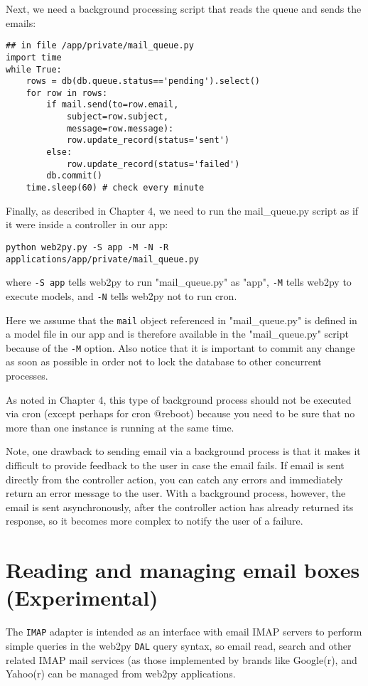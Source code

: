 \documentclass[justified,sixbynine,notoc]{tufte-book}
\def\ft{\small\tt}
\begin{document}
\begin{fullwidth}
Next, we need a background processing script that reads the queue and sends the emails:
\begin{lstlisting}
## in file /app/private/mail_queue.py
import time
while True:
    rows = db(db.queue.status=='pending').select()
    for row in rows:
        if mail.send(to=row.email,
            subject=row.subject,
            message=row.message):
            row.update_record(status='sent')
        else:
            row.update_record(status='failed')
        db.commit()
    time.sleep(60) # check every minute
\end{lstlisting}

Finally, as described in Chapter 4, we need to run the mail\_queue.py script as if it were inside a controller in our app:
\begin{lstlisting}
python web2py.py -S app -M -N -R applications/app/private/mail_queue.py
\end{lstlisting}
\noindent where {\ft -S app} tells web2py to run "mail\_queue.py" as "app", {\ft -M} tells web2py to execute models, and {\ft -N} tells web2py not to run cron.

Here we assume that the {\ft mail} object referenced in "mail\_queue.py" is defined in a model file in our app and is therefore available in the "mail\_queue.py" script because of the {\ft -M} option. Also notice that it is important to commit any change as soon as possible in order not to lock the database to other concurrent processes.

As noted in Chapter 4, this type of background process should not be executed via cron (except perhaps for cron @reboot) because you need to be sure that no more than one instance is running at the same time.

Note, one drawback to sending email via a background process is that it makes it difficult to provide feedback to the user in case the email fails. If email is sent directly from the controller action, you can catch any errors and immediately return an error message to the user. With a background process, however, the email is sent asynchronously, after the controller action has already returned its response, so it becomes more complex to notify the user of a failure.

\goodbreak\section{Reading and managing email boxes (Experimental)}

The {\ft IMAP} adapter is intended as an interface with email IMAP servers to perform simple queries in the web2py {\ft DAL} query syntax, so email read, search and other related IMAP mail services (as those implemented by brands like Google(r), and Yahoo(r) can be managed from web2py applications.


\end{fullwidth}
\end{document}
